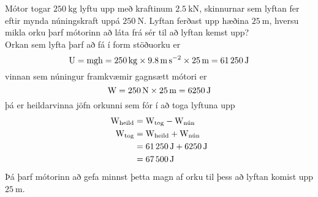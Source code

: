 %
\begin{formalexample}
Mótor togar $\SI{250}{\kg}$ lyftu upp með 
kraftinum $\SI{2.5}{\kN}$, skinnurnar sem lyftan fer
eftir mynda núningskraft uppá $\SI{250}{\N}$. Lyftan 
ferðast upp hæðina $\SI{25}{\m}$,
hversu mikla orku þarf mótorinn að láta frá sér til að lyftan kemst upp?
\\[4 ex]
Orkan sem lyfta þarf að fá í form stöðuorku er
\[
	\upotentialu = \umass \uacceleg \ulengthh 
		= \SI{250}{\kg} \times \SI{9.8}{\m\per\s\squared}
			\times \SI{25}{\m}
		= \SI{61250}{\J}
\]
vinnan sem núningur framkvæmir gagnsætt mótori er
\[
	\uworkw = \SI{250}{\N} \times \SI{25}{\m}
		= \SI{6250}{\J}
\]
þá er heildarvinna jöfn orkunni sem fór í að toga lyftuna upp
\begin{align*}
	\uworkw_\text{heild} &= \uworkw_\text{tog} - \uworkw_\text{nún}\\
	\uworkw_\text{tog} &= \uworkw_\text{heild} + \uworkw_\text{nún}\\
		&= \SI{61250}{\J} + \SI{6250}{\J} \\
		&= \SI{67500}{\J}
\end{align*}
Þá þarf mótorinn að gefa minnst þetta magn af orku til þess að lyftan komist upp
$\SI{25}{\m}$.
\end{formalexample}
%
